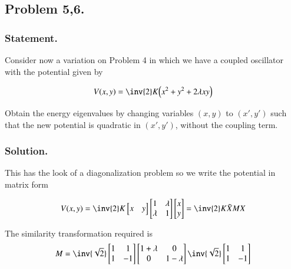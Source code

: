 \subsection{Problem 5,6.}
\subsubsection{Statement.}

Consider now a variation on Problem 4 in which we have a coupled oscillator with the potential given by

\begin{align}\label{eqn:desaiCh9:500}
V(x,y) = \inv{2} K \Bigl( x^2 + y^2 + 2 \lambda x y \Bigr)
\end{align}

Obtain the energy eigenvalues by changing variables $(x,y)$ to $(x', y')$ such that the new potential is quadratic in $(x', y')$, without the coupling term.

\subsubsection{Solution.}

This has the look of a diagonalization problem so we write the potential in matrix form

\begin{align}\label{eqn:desaiCh9:501}
V(x,y)
= \inv{2} K
\begin{bmatrix}
x & y
\end{bmatrix}
\begin{bmatrix}
1 & \lambda \\
\lambda & 1
\end{bmatrix}
\begin{bmatrix}
x \\ y
\end{bmatrix} = \inv{2} K \tilde{X} M X
\end{align}

The similarity transformation required is
\begin{align}\label{eqn:desaiCh9:502}
M = \inv{\sqrt{2}}
\begin{bmatrix}
1 & 1 \\
1 & -1
\end{bmatrix}
\begin{bmatrix}
1+ \lambda & 0 \\
0 & 1 - \lambda
\end{bmatrix}
\inv{\sqrt{2}}
\begin{bmatrix}
1 & 1 \\
1 & -1
\end{bmatrix}
\end{align}

